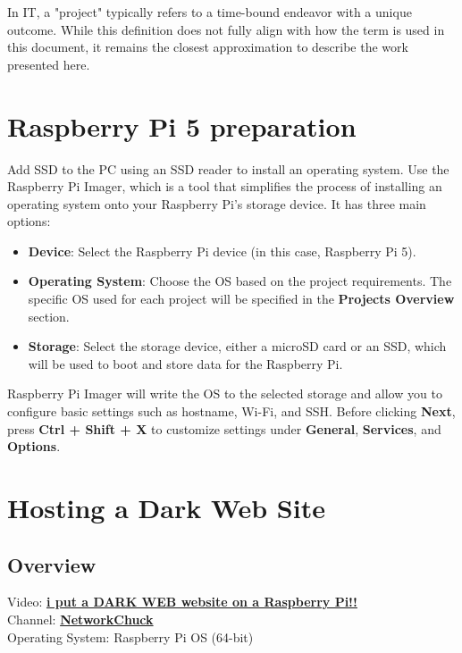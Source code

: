 \documentclass[a4paper,12pt]{article}
\begin{document}
In IT, a "project" typically refers to a time-bound endeavor with a unique outcome. While this definition does not fully align with how the term is used in this document, it remains the closest approximation to describe the work presented here.

\section*{Raspberry Pi 5 preparation}

Add SSD to the PC using an SSD reader to install an operating system. Use the Raspberry Pi Imager, which is a tool that simplifies the process of installing an operating system onto your Raspberry Pi’s storage device. It has three main options:
\begin{itemize}
\item \textbf{Device}: Select the Raspberry Pi device (in this case, Raspberry Pi 5).
\item \textbf{Operating System}: Choose the OS based on the project requirements. The specific OS used for each project will be specified in the \textbf{Projects Overview} section.
\item \textbf{Storage}: Select the storage device, either a microSD card or an SSD, which will be used to boot and store data for the Raspberry Pi.
\end{itemize}

Raspberry Pi Imager will write the OS to the selected storage and allow you to configure basic settings such as hostname, Wi-Fi, and SSH. Before clicking \textbf{Next}, press \textbf{Ctrl + Shift + X} to customize settings under \textbf{General}, \textbf{Services}, and \textbf{Options}.

\section{Hosting a Dark Web Site}

\subsection{Overview}
Video: \href{https://www.youtube.com/watch?v=bllS9tkCkaM}{\textbf{\color{blue}i put a DARK WEB website on a Raspberry Pi!!}} \\
Channel: \href{https://www.youtube.com/@NetworkChuck}{\textbf{\color{blue}NetworkChuck}} \\
Operating System: Raspberry Pi OS (64-bit)
\end{document}
